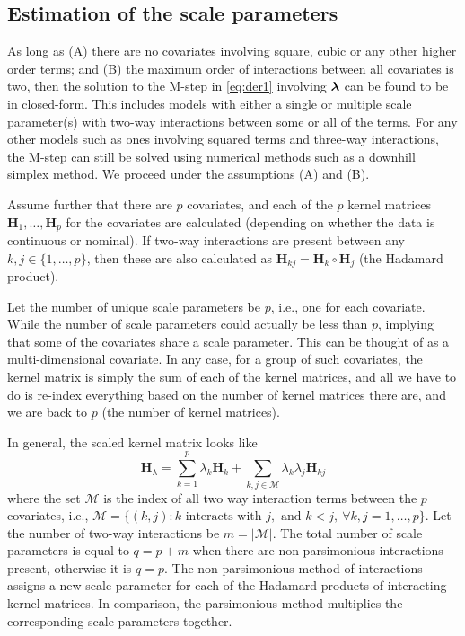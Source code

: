 \subsection{Estimation of the scale parameters}

As long as (A) there are no covariates involving square, cubic or any other higher order terms; and (B) the maximum order of interactions between all covariates is two, then the solution to the M-step in \eqref{eq:der1} involving $\boldsymbol\lambda$ can be found to be in closed-form. This includes models with either a single or multiple scale parameter(s) with two-way interactions between some or all of the terms. For any other models such as ones involving squared terms and three-way interactions, the M-step can still be solved using numerical methods such as a downhill simplex method. We proceed under the assumptions (A) and (B).

Assume further that there are $p$ covariates, and each of the $p$ kernel matrices $\mathbf H_1, \dots, \mathbf H_p$ for the covariates are calculated (depending on whether the data is continuous or nominal). If two-way interactions are present between any $k,j \in \{1,\dots,p\}$, then these are also calculated as $\mathbf H_{kj} = \mathbf H_k \circ \mathbf H_j$ (the Hadamard product).

Let the number of unique scale parameters be $p$, i.e., one for each covariate. While the number of scale parameters could actually be less than $p$, implying that some of the covariates share a scale parameter. This can be thought of as a multi-dimensional covariate. In any case, for a group of such covariates, the kernel matrix is simply the sum of each of the kernel matrices, and all we have to do is re-index everything based on the number of kernel matrices there are, and we are back to $p$ (the number of kernel matrices).

In general, the scaled kernel matrix looks like
\[
	\mathbf H_{\lambda} = \sum_{k=1}^p \lambda_k \mathbf H_k + \sum_{k,j\in \mathcal M} \lambda_k\lambda_j \mathbf H_{kj}
\]
where the set $\mathcal M$ is the index of all two way interaction terms between the $p$ covariates, i.e., $\mathcal M=\{(k,j): k \text{ interacts with } j, \text{ and } k < j, \ \forall k,j=1,\dots,p \}$. Let the number of two-way interactions be $m=|\mathcal M|$. The total number of scale parameters is equal to $q=p+m$ when there are non-parsimonious interactions present, otherwise it is $q=p$. The non-parsimonious method of interactions assigns a new scale parameter for each of the Hadamard products of interacting kernel matrices\footnotemark. In comparison, the parsimonious method multiplies the corresponding scale parameters together. 

